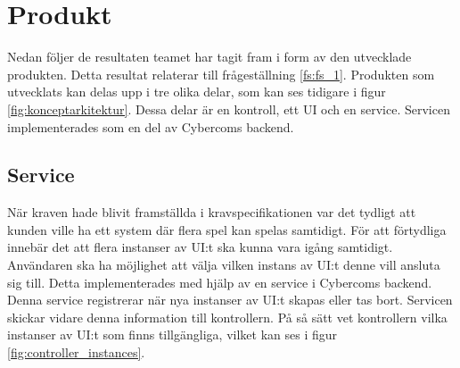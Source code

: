 \section{Produkt}
Nedan följer de resultaten teamet har tagit fram i form av den utvecklade produkten. Detta resultat relaterar till frågeställning \ref{fs:fs_1}. Produkten som utvecklats kan delas upp i tre olika delar, som kan ses tidigare i figur \ref{fig:konceptarkitektur}. Dessa delar är en kontroll, ett UI och en service. Servicen implementerades som en del av Cybercoms backend.

\subsection{Service}
När kraven hade blivit framställda i kravspecifikationen var det tydligt att kunden ville ha ett system där flera spel kan spelas samtidigt. För att förtydliga innebär det att flera instanser av UI:t ska kunna vara igång samtidigt. Användaren ska ha möjlighet att välja vilken instans av UI:t denne vill ansluta sig till. Detta implementerades med hjälp av en service i Cybercoms backend. Denna service registrerar när nya instanser av UI:t skapas eller tas bort. Servicen skickar vidare denna information till kontrollern. På så sätt vet kontrollern vilka instanser av UI:t som finns tillgängliga, vilket kan ses i figur \ref{fig:controller_instances}.

